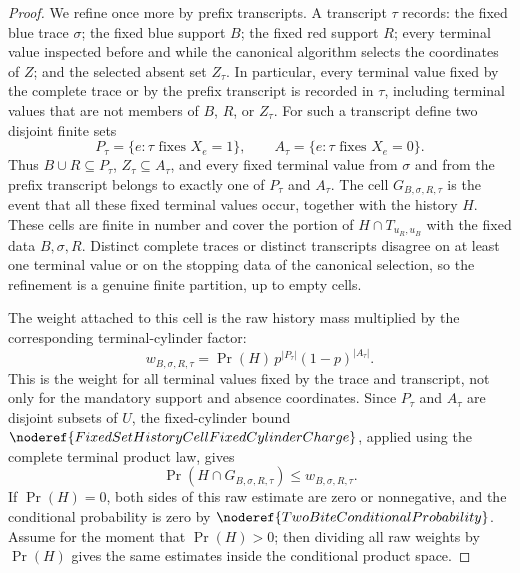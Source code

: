 \begin{proof}
We refine once more by prefix transcripts.  A transcript \(\tau\) records:
the fixed blue trace \(\sigma\); the fixed blue support \(B\); the fixed red
support \(R\); every terminal value inspected before and while the canonical
algorithm selects the coordinates of \(Z\); and the selected absent set
\(Z_\tau\).  In particular, every terminal value fixed by the complete trace
or by the prefix transcript is recorded in \(\tau\), including terminal
values that are not members of \(B\), \(R\), or \(Z_\tau\).  For such a
transcript define two disjoint finite sets
\[
P_\tau=\{e:\tau\text{ fixes }X_e=1\},\qquad
A_\tau=\{e:\tau\text{ fixes }X_e=0\}.
\]
Thus \(B\cup R\subseteq P_\tau\), \(Z_\tau\subseteq A_\tau\), and every fixed
terminal value from \(\sigma\) and from the prefix transcript belongs to
exactly one of \(P_\tau\) and \(A_\tau\).  The cell \(G_{B,\sigma,R,\tau}\)
is the event that all these fixed terminal values occur, together with the
history \(H\).  These cells are finite in number and cover the portion of
\(H\cap T_{u_R,u_B}\) with the fixed data \(B,\sigma,R\).  Distinct complete
traces or distinct transcripts disagree on at least one terminal value or on
the stopping data of the canonical selection, so the refinement is a genuine
finite partition, up to empty cells.

The weight attached to this cell is the raw history mass multiplied by the
corresponding terminal-cylinder factor:
\[
w_{B,\sigma,R,\tau}
=\Pr(H)\,p^{|P_\tau|}(1-p)^{|A_\tau|}.
\]
This is the weight for all terminal values fixed by the trace and transcript,
not only for the mandatory support and absence coordinates.  Since
\(P_\tau\) and \(A_\tau\) are disjoint subsets of \(U\), the fixed-cylinder
bound \(\noderef{FixedSetHistoryCellFixedCylinderCharge}\), applied using the
complete terminal product law, gives
\[
\Pr(H\cap G_{B,\sigma,R,\tau})
\le w_{B,\sigma,R,\tau}.
\]
If \(\Pr(H)=0\), both sides of this raw estimate are zero or nonnegative, and
the conditional probability is zero by
\(\noderef{TwoBiteConditionalProbability}\).  Assume for the moment that
\(\Pr(H)>0\); then dividing all raw weights by \(\Pr(H)\) gives the same
estimates inside the conditional product space.


\end{proof}
